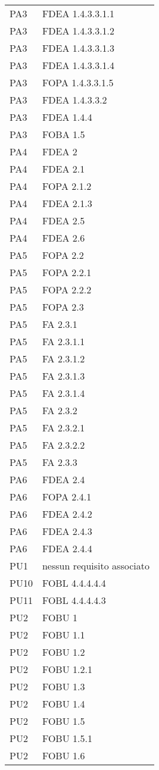 \begin{longtable}{XX}
PA3&FDEA 1.4.3.3.1.1\\ 
PA3&FDEA 1.4.3.3.1.2\\ 
PA3&FDEA 1.4.3.3.1.3\\ 
PA3&FDEA 1.4.3.3.1.4\\ 
PA3&FOPA 1.4.3.3.1.5\\ 
PA3&FDEA 1.4.3.3.2\\ 
PA3&FDEA 1.4.4\\ 
PA3&FOBA 1.5\\ 
\midrule 
PA4&FDEA 2\\ 
PA4&FDEA 2.1\\ 
PA4&FOPA 2.1.2\\ 
PA4&FDEA 2.1.3\\ 
PA4&FDEA 2.5\\ 
PA4&FDEA 2.6\\ 
\midrule 
PA5&FOPA 2.2\\ 
PA5&FOPA 2.2.1\\ 
PA5&FOPA 2.2.2\\ 
PA5&FOPA 2.3\\ 
PA5&FA 2.3.1\\ 
PA5&FA 2.3.1.1\\ 
PA5&FA 2.3.1.2\\ 
PA5&FA 2.3.1.3\\ 
PA5&FA 2.3.1.4\\ 
PA5&FA 2.3.2\\ 
PA5&FA 2.3.2.1\\ 
PA5&FA 2.3.2.2\\ 
PA5&FA 2.3.3\\ 
\midrule 
PA6&FDEA 2.4\\ 
PA6&FOPA 2.4.1\\ 
PA6&FDEA 2.4.2\\ 
PA6&FDEA 2.4.3\\ 
PA6&FDEA 2.4.4\\ 
\midrule 
PU1&nessun requisito associato\\ 
\midrule 
PU10&FOBL 4.4.4.4.4\\ 
\midrule 
PU11&FOBL 4.4.4.4.3\\ 
\midrule 
PU2&FOBU 1\\ 
PU2&FOBU 1.1\\ 
PU2&FOBU 1.2\\ 
PU2&FOBU 1.2.1\\ 
PU2&FOBU 1.3\\ 
PU2&FOBU 1.4\\ 
PU2&FOBU 1.5\\ 
PU2&FOBU 1.5.1\\ 
PU2&FOBU 1.6\\ 

\end{longtable}
